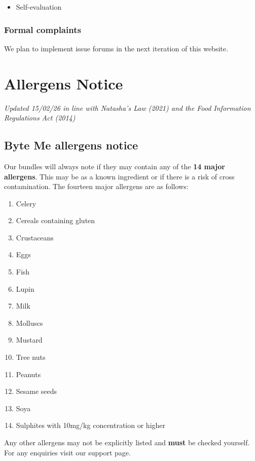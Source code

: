 \documentclass[11pt, a4paper]{report}
\begin{document}
\begin{itemize}
	\item Self-evaluation
\end{itemize}

\subsection*{Formal complaints}
We plan to implement issue forums in the next iteration of this website.

\chapter{Allergens Notice}
\textit{Updated 15/02/26 in line with Natasha's Law (2021) and the Food Information Regulations Act (2014)}
\bigskip

\section*{Byte Me allergens notice}
Our bundles will always note if they may contain any of the \textbf{14 major allergens}. This may be as a known ingredient or if there is a risk of cross contamination. The fourteen major allergens are as follows:

\begin{enumerate}
	\item Celery
	\item Cereals containing gluten
	\item Crustaceans
	\item Eggs
	\item Fish
	\item Lupin
	\item Milk
	\item Molluscs
	\item Mustard
	\item Tree nuts
	\item Peanuts
	\item Sesame seeds
	\item Soya
	\item Sulphites with 10mg/kg concentration or higher
\end{enumerate}

Any other allergens may not be explicitly listed and \textbf{must} be checked yourself. For any enquiries visit our support page.
\end{document}
